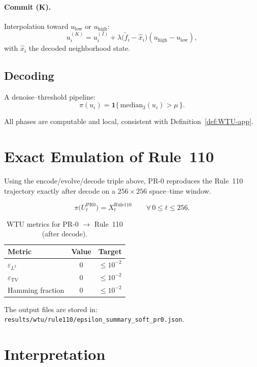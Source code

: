 \paragraph{Commit (K).}
Interpolation toward $u_{\mathrm{low}}$ or $u_{\mathrm{high}}$:
\[
u^{(K)}_i = u^{(I)}_i + \lambda\big(\tilde{f}_i - \hat{x}_i\big)(u_{\mathrm{high}}-u_{\mathrm{low}}),
\]
with $\hat{x}_i$ the decoded neighborhood state.

\subsection{Decoding}
A denoise--threshold pipeline:
\[
\pi(u_i) = \mathbf{1}\{\,\mathrm{median}_3(u_i)>\mu\,\}.
\]

All phases are computable and local, consistent with Definition~\ref{def:WTU-app}.

\section{Exact Emulation of Rule~110}

Using the encode/evolve/decode triple above, PR-0 reproduces the Rule~110 trajectory exactly
after decode on a $256\times256$ space--time window.

\begin{equation}
\pi\big(U_t^{\mathrm{PR0}}\big)=X_t^{\mathrm{Rule110}}
\qquad\forall\, 0\le t\le 256.
\end{equation}

\begin{table}[h]
\centering
\caption{WTU metrics for PR-0 $\to$ Rule~110 (after decode).}
\label{tab:WTU-metrics}
\begin{tabular}{lcc}
\toprule
Metric & Value & Target \\
\midrule
$\varepsilon_{L^2}$ & $0$ & $\le 10^{-2}$ \\
$\varepsilon_{\mathrm{TV}}$ & $0$ & $\le 10^{-2}$ \\
Hamming fraction & $0$ & $\le 10^{-2}$ \\
\bottomrule
\end{tabular}
\end{table}

The output files are stored in:\\[4pt]
\texttt{results/wtu/rule110/epsilon\_summary\_soft\_pr0.json}.

\section{Interpretation}

